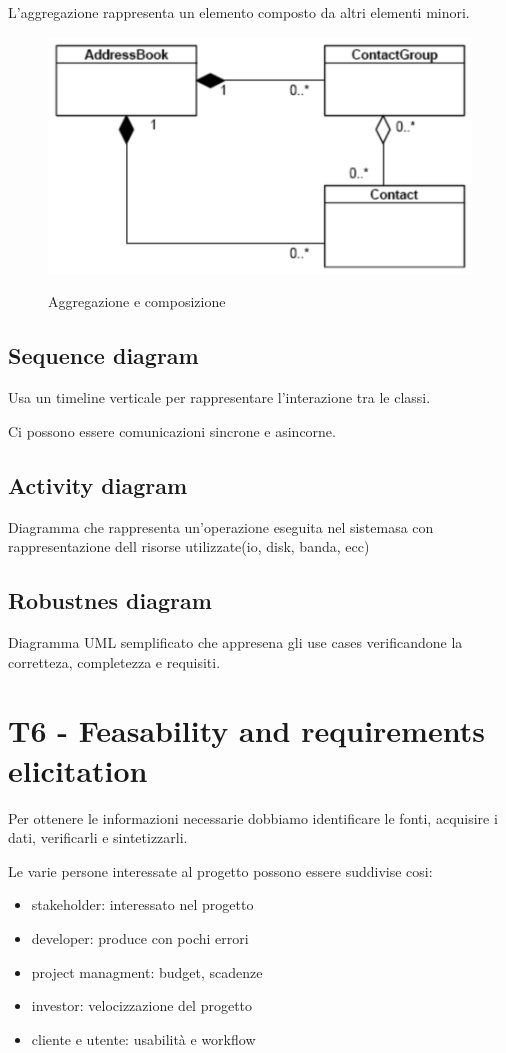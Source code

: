 \documentclass{article}
\begin{document}
L'aggregazione rappresenta un elemento composto da altri elementi minori.


\begin{figure}[h!]
    \centering
    \includegraphics[width=0.3\linewidth]{imgs/7 - aggregazione.png}
    \label{fig:aggregazione}
    \caption{Aggregazione e composizione}
\end{figure}

\subsection{Sequence diagram}
Usa un timeline verticale per rappresentare l'interazione tra le classi.

Ci possono essere comunicazioni sincrone e asincorne.
\subsection{Activity diagram}
Diagramma che rappresenta un'operazione eseguita nel sistemasa con rappresentazione
dell risorse utilizzate(io, disk, banda, ecc)

\subsection{Robustnes diagram}

Diagramma UML semplificato che appresena gli use cases verificandone la corretteza, 
completezza e requisiti.

\section{T6 - Feasability and requirements elicitation}
Per ottenere le informazioni necessarie dobbiamo identificare le fonti, acquisire i dati,
verificarli e sintetizzarli.

Le varie persone interessate al progetto possono essere suddivise cosi:
\begin{itemize}
    \item stakeholder: interessato nel progetto
    \item developer: produce con pochi errori
    \item project managment: budget, scadenze
    \item investor: velocizzazione del progetto
    \item cliente e utente: usabilità e workflow
\end{itemize}
\end{document}
